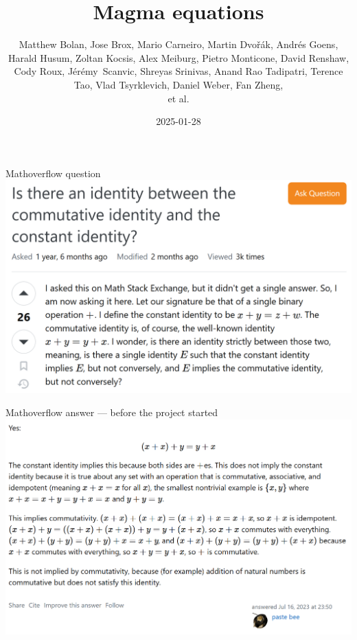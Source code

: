 \documentclass{beamer}
\title{Magma equations}
\author{Matthew Bolan, Jose Brox, Mario Carneiro, Martin Dvo\v{r}\'ak, Andr\'es Goens, Harald Husum, Zoltan Kocsis, Alex Meiburg, Pietro Monticone, David Renshaw, Cody Roux, J\'er\'emy~Scanvic, Shreyas Srinivas, Anand Rao Tadipatri, Terence Tao, Vlad Tsyrklevich, Daniel Weber, Fan Zheng,\\et al.}
\date{2025-01-28}
\begin{document}
\begin{frame}[plain]
\maketitle
\end{frame}


\begin{frame}{Mathoverflow question}
\includegraphics[width=\textwidth]{mathoverflow}
\end{frame}


\begin{frame}{Mathoverflow answer --- before the project started}
\includegraphics[width=\textwidth]{mathoverflow_bee}
\end{frame}
\end{document}
